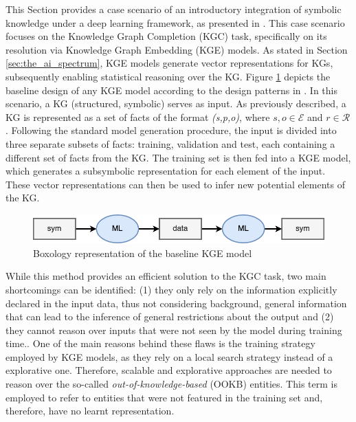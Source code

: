 This Section provides a case scenario of an introductory integration of symbolic knowledge under a deep learning framework, as presented in \cite{amadoretalontodl}. This case scenario focuses on the Knowledge Graph Completion (KGC) task, specifically on its resolution via Knowledge Graph Embedding (KGE) models. As stated in Section \ref{sec:the_ai_spectrum}, KGE models generate vector representations for KGs, subsequently enabling statistical reasoning over the KG. Figure \ref{fig:box_krintodl_base} depicts the baseline design of any KGE model according to the design patterns in \cite{boxologyfrank}. In this scenario, a KG (structured, symbolic) serves as input. As previously described, a KG is represented as a set of facts of the format \textit{(s,p,o)}, where $s,o \in \mathcal{E}$ and $r \in \mathcal{R}$. Following the standard model generation procedure, the input is divided into three separate subsets of facts: training, validation and test, each containing a different set of facts from the KG. The training set is then fed into a KGE model, which generates a subsymbolic representation for each element of the input. These vector representations can then be used to infer new potential elements of the KG. 

\begin{figure}
    \centering
    \includegraphics[width=\linewidth]{4_kbsintegrationdl/figures/boxology_krintodl_base.png}
    \caption{Boxology representation of the baseline KGE model}
    \label{fig:box_krintodl_base}
\end{figure}


While this method provides an efficient solution to the KGC task, two main shortcomings can be identified: (1) they only rely on the information explicitly declared in the input data, thus not considering background, general information that can lead to the inference of general restrictions about the output and (2) they cannot reason over inputs that were not seen by the model during training time.. One of the main reasons behind these flaws is the training strategy employed by KGE models, as they rely on a local search strategy instead of a explorative one. Therefore, scalable and explorative approaches are needed to reason over the so-called \textit{out-of-knowledge-based} (OOKB) entities. This term is employed to refer to entities that were not featured in the training set and, therefore, have no learnt representation. 

